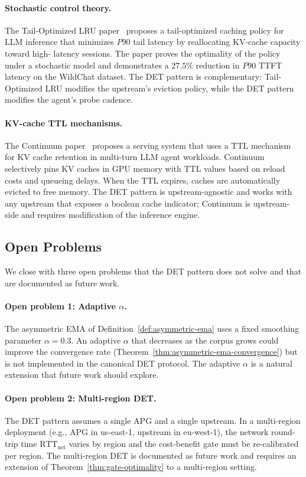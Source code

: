 \paragraph{Stochastic control theory.}
The Tail-Optimized LRU paper~\citep{tailoptimized2025} proposes a
tail-optimized caching policy for LLM inference that minimizes
$P90$ tail latency by reallocating KV-cache capacity toward high-
latency sessions. The paper proves the optimality of the policy
under a stochastic model and demonstrates a $27.5\%$ reduction in
$P90$ TTFT latency on the WildChat dataset. The DET pattern is
complementary: Tail-Optimized LRU modifies the upstream's eviction
policy, while the DET pattern modifies the agent's probe cadence.

\paragraph{KV-cache TTL mechanisms.}
The Continuum paper~\citep{continuum2025} proposes a serving system
that uses a TTL mechanism for KV cache retention in multi-turn LLM
agent workloads. Continuum selectively pins KV caches in GPU memory
with TTL values based on reload costs and queueing delays. When the
TTL expires, caches are automatically evicted to free memory. The
DET pattern is upstream-agnostic and works with any upstream that
exposes a boolean cache indicator; Continuum is upstream-side and
requires modification of the inference engine.

\subsection{Open Problems}

We close with three open problems that the DET pattern does not solve
and that are documented as future work.

\paragraph{Open problem 1: Adaptive $\alpha$.}
The asymmetric EMA of Definition~\ref{def:asymmetric-ema} uses a
fixed smoothing parameter $\alpha = 0.3$. An adaptive $\alpha$ that
decreases as the corpus grows could improve the convergence rate
(Theorem~\ref{thm:asymmetric-ema-convergence}) but is not
implemented in the canonical DET protocol. The adaptive $\alpha$ is
a natural extension that future work should explore.

\paragraph{Open problem 2: Multi-region DET.}
The DET pattern assumes a single APG and a single upstream. In a
multi-region deployment (e.g., APG in us-east-1, upstream in
eu-west-1), the network round-trip time $\mathrm{RTT}_{\mathrm{net}}$
varies by region and the cost-benefit gate must be re-calibrated
per region. The multi-region DET is documented as future work and
requires an extension of Theorem~\ref{thm:gate-optimality} to a
multi-region setting.

